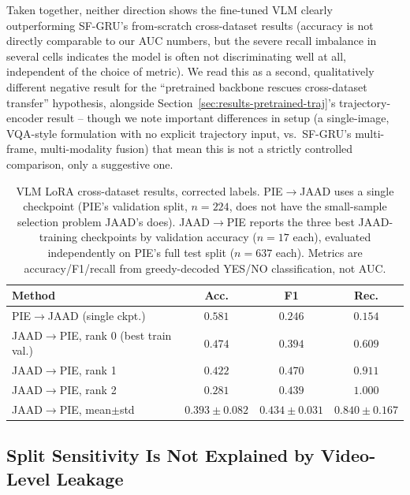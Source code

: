 Taken together, neither direction shows the fine-tuned VLM clearly
outperforming SF-GRU's from-scratch cross-dataset results (accuracy is
not directly comparable to our AUC numbers, but the severe recall
imbalance in several cells indicates the model is often not
discriminating well at all, independent of the choice of metric). We
read this as a second, qualitatively different negative result for the
``pretrained backbone rescues cross-dataset transfer'' hypothesis,
alongside Section~\ref{sec:results-pretrained-traj}'s trajectory-encoder
result -- though we note important differences in setup (a
single-image, VQA-style formulation with no explicit trajectory input,
vs.\ SF-GRU's multi-frame, multi-modality fusion) that mean this is not
a strictly controlled comparison, only a suggestive one.

\begin{table}[t]
\centering
\caption{VLM LoRA cross-dataset results, corrected labels. PIE$\to$JAAD
uses a single checkpoint (PIE's validation split, $n=224$, does not
have the small-sample selection problem JAAD's does). JAAD$\to$PIE
reports the three best JAAD-training checkpoints by validation accuracy
($n=17$ each), evaluated independently on PIE's full test split
($n=637$ each). Metrics are accuracy/F1/recall from greedy-decoded
YES/NO classification, not AUC.}
\label{tab:vlm-topk}
\begin{tabular}{lccc}
\toprule
Method & Acc. & F1 & Rec. \\
\midrule
PIE$\to$JAAD (single ckpt.) & $0.581$ & $0.246$ & $0.154$ \\
\midrule
JAAD$\to$PIE, rank 0 (best train val.) & $0.474$ & $0.394$ & $0.609$ \\
JAAD$\to$PIE, rank 1 & $0.422$ & $0.470$ & $0.911$ \\
JAAD$\to$PIE, rank 2 & $0.281$ & $0.439$ & $1.000$ \\
JAAD$\to$PIE, mean$\pm$std & $0.393\pm0.082$ & $0.434\pm0.031$ & $0.840\pm0.167$ \\
\bottomrule
\end{tabular}
\end{table}

\subsection{Split Sensitivity Is Not Explained by Video-Level Leakage}
\label{sec:results-leakage}


